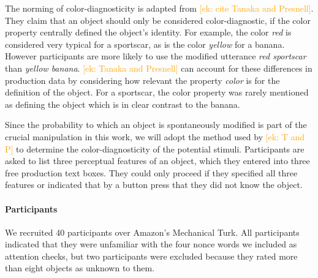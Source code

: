 \documentclass[a4paper,man,floatsintext,natbib,donotrepeattitle]{apa6}
\newcommand{\ek}[1]{\textcolor{Orange}{[ek: #1]}}
\begin{document}





The norming of color-diagnosticity is adapted from \ek{cite Tanaka and Presnell}. They claim that an object should only be considered color-diagnostic, if the color property centrally defined the object's identity. For example, the color \textit{red} is considered very typical for a sportscar, as is the color \textit{yellow} for a banana. However participants are more likely to use the modified utterance \textit{red sportscar} than \textit{yellow banana}. \ek{Tanaka and Presnell} can account for these differences in production data by considering how relevant the property \textit{color} is for the definition of the object. For a sportscar, the color property was rarely mentioned as defining the object which is in clear contrast to the banana.

Since the probability to which an object is spontaneously modified is part of the crucial manipulation in this work, we will adopt the method used by \ek{T and P} to determine the color-diagnosticity of the potential stimuli. Participants are asked to list three perceptual features of an object, which they entered into three free production text boxes. They could only proceed if they specified all three features or indicated that by a button press that they did not know the object.

\paragraph{Participants}
We recruited 40 participants over Amazon's Mechanical Turk. All participants indicated that they were unfamiliar with the four nonce words we included as attention checks, but two participants were excluded because they rated more than eight objects as unknown to them.
\end{document}
